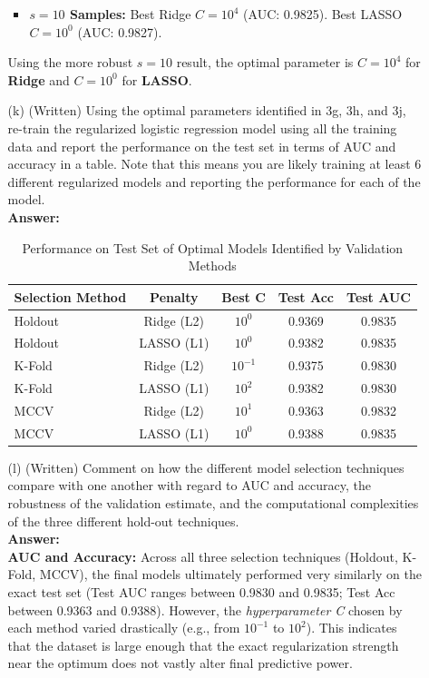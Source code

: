 \documentclass[a4paper,12pt]{article}
\begin{document}
\begin{enumerate}
\begin{enumerate}
\begin{itemize}
            \item \textbf{$s=10$ Samples:} Best Ridge $C = 10^4$ (AUC: 0.9825). Best LASSO $C = 10^0$ (AUC: 0.9827).
        \end{itemize}
        Using the more robust $s=10$ result, the optimal parameter is $C=10^4$ for \textbf{Ridge} and $C=10^0$ for \textbf{LASSO}.
        \item[(k)] (Written) Using the optimal parameters identified in 3g, 3h, and 3j, re-train the regularized logistic regression model using all the training data and report the performance on the test set in terms of AUC and accuracy in a table. Note that this means you are likely training at least 6 different regularized models and reporting the performance for each of the model. \\
        \textbf{Answer:} 
        \begin{table}[h]
        \centering
        \begin{tabular}{|l|c|c|c|c|}
        \hline
        \textbf{Selection Method} & \textbf{Penalty} & \textbf{Best C} & \textbf{Test Acc} & \textbf{Test AUC} \\
        \hline
        Holdout & Ridge (L2) & $10^{0}$ & 0.9369 & 0.9835 \\
        Holdout & LASSO (L1) & $10^{0}$ & 0.9382 & 0.9835 \\
        K-Fold & Ridge (L2) & $10^{-1}$ & 0.9375 & 0.9830 \\
        K-Fold & LASSO (L1) & $10^{2}$ & 0.9382 & 0.9830 \\
        MCCV & Ridge (L2) & $10^{1}$ & 0.9363 & 0.9832 \\
        MCCV & LASSO (L1) & $10^{0}$ & 0.9388 & 0.9835 \\
        \hline
        \end{tabular}
        \caption{Performance on Test Set of Optimal Models Identified by Validation Methods}
        \end{table}
        \item[(l)] (Written) Comment on how the different model selection techniques compare with one another with regard to AUC and accuracy, the robustness of the validation estimate, and the computational complexities of the three different hold-out techniques. \\
        \textbf{Answer:} \\
        \textbf{AUC and Accuracy:} Across all three selection techniques (Holdout, K-Fold, MCCV), the final models ultimately performed very similarly on the exact test set (Test AUC ranges between 0.9830 and 0.9835; Test Acc between 0.9363 and 0.9388). However, the \textit{hyperparameter C} chosen by each method varied drastically (e.g., from $10^{-1}$ to $10^2$). This indicates that the dataset is large enough that the exact regularization strength near the optimum does not vastly alter final predictive power. \\

\end{enumerate}
\end{enumerate}
\end{document}

